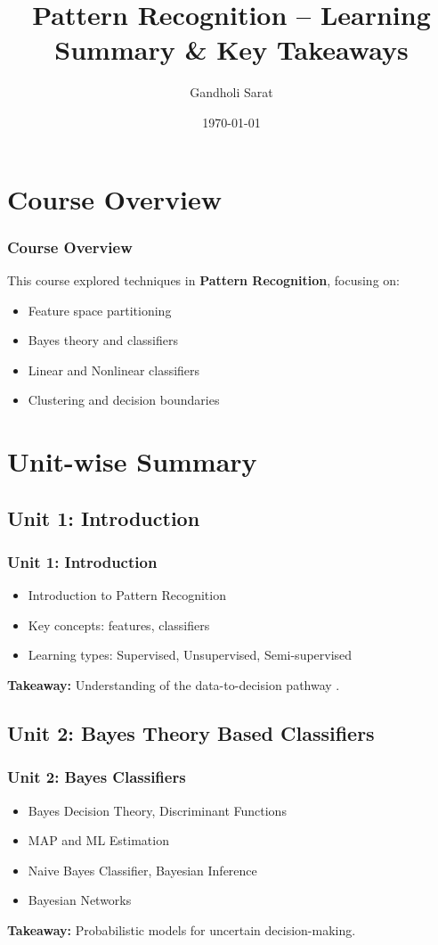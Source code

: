 \documentclass{beamer}
\title{Pattern Recognition – Learning Summary \& Key Takeaways}
\author{Gandholi Sarat}
\date{\today}
\begin{document}
\maketitle

\section{Course Overview}
\begin{frame}
\frametitle{Course Overview}
This course explored techniques in \textbf{Pattern Recognition}, focusing on:
\begin{itemize}
  \item Feature space partitioning
  \item Bayes theory and classifiers
  \item Linear and Nonlinear classifiers
  \item Clustering and decision boundaries
\end{itemize}
\end{frame}

\section{Unit-wise Summary}

\subsection{Unit 1: Introduction}
\begin{frame}
\frametitle{Unit 1: Introduction }
\begin{itemize}
  \item Introduction to Pattern Recognition
  \item Key concepts: features, classifiers
  \item Learning types: Supervised, Unsupervised, Semi-supervised
\end{itemize}
\textbf{Takeaway:} Understanding of the data-to-decision pathway .
\end{frame}

\subsection{Unit 2: Bayes Theory Based Classifiers}
\begin{frame}
\frametitle{Unit 2: Bayes Classifiers}
\begin{itemize}
  \item Bayes Decision Theory, Discriminant Functions
  \item MAP and ML Estimation
  \item Naive Bayes Classifier, Bayesian Inference
  \item Bayesian Networks
\end{itemize}
\textbf{Takeaway:} Probabilistic models for uncertain decision-making.
\end{frame}
\end{document}
